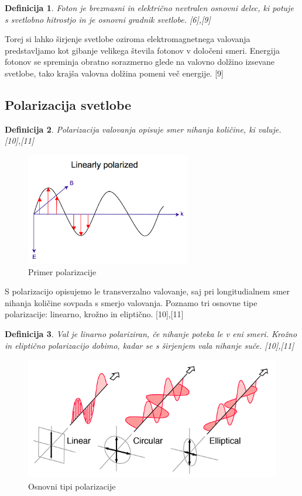 \documentclass[A4paper, 11pt]{article}
\newtheorem{definicija}{Definicija}
\begin{document}
\begin{definicija}
Foton je brezmasni in električno nevtralen osnovni delec, ki potuje s svetlobno hitrostjo in je osnovni gradnik svetlobe. [6],[9]
\end{definicija} 

Torej si lahko širjenje svetlobe oziroma elektromagnetnega valovanja predstavljamo kot gibanje velikega števila fotonov v določeni smeri. Energija fotonov se spreminja obratno sorazmerno glede na valovno dolžino izsevane svetlobe, tako krajša valovna dolžina pomeni več energije. [9]

\subsection{Polarizacija svetlobe}

\begin{definicija}
Polarizacija valovanja opisuje smer nihanja količine, ki valuje. [10],[11]
\end{definicija}

\begin{figure}[h]
\centering
\caption{Primer polarizacije}
\includegraphics[scale=0.75]{images}
\end{figure}

S polarizacijo opisujemo le transverzalno valovanje, saj pri longitudialnem smer nihanja količine sovpada s smerjo valovanja. Poznamo tri osnovne tipe polarizacije: linearno, krožno in eliptično. [10],[11]

\begin{definicija}
Val je linarno polariziran, če nihanje poteka le v eni smeri. Krožno in eliptično polarizacijo dobimo, kadar se s širjenjem vala nihanje suče. [10],[11]
\end{definicija}

\begin{figure}[h]
\centering
\caption{Osnovni tipi polarizacije}
\includegraphics[scale=2]{polcls}
\end{figure}
\end{document}
